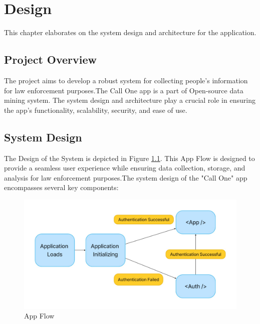\chapter{Design}\label{ch:design}
\justify

This chapter elaborates on the system design and architecture for the {\myprojectname} application.

\section{Project Overview}\label{sec:project-overview}

The {\myprojectname} project aims to develop a robust system for collecting people's information for law enforcement purposes.The Call One app is a part of Open-source data mining system.
The system design and architecture play a crucial role in ensuring the app's functionality, scalability, security, and ease of use.

\section{System Design}\label{sec:system-design}

The Design of the System is depicted in Figure \ref{fig:App Flow}.
This App Flow is designed to provide a seamless user experience while ensuring data collection, storage, and analysis for law enforcement purposes.The system design of the "Call One" app encompasses several key components:

\begin{figure}
    \centering
    \includegraphics[width=1\linewidth]{Media//Application_Flow}
    \caption{App Flow}
    \label{fig:App Flow}
\end{figure}


